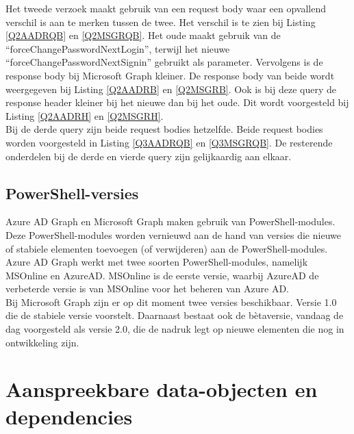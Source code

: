 Het tweede verzoek maakt gebruik van een request body waar een opvallend verschil is aan te merken tussen de twee. Het verschil is te zien bij Listing \ref{Q2AADRQB} en \ref{Q2MSGRQB}. Het oude maakt gebruik van de “forceChangePasswordNextLogin”, terwijl het nieuwe “forceChangePasswordNextSignin” gebruikt als parameter. Vervolgens is de response body bij Microsoft Graph kleiner. De response body van beide wordt weergegeven bij Listing \ref{Q2AADRB} en \ref{Q2MSGRB}. Ook is bij deze query de response header kleiner bij het nieuwe dan bij het oude. Dit wordt voorgesteld bij Listing \ref{Q2AADRH} en \ref{Q2MSGRH}. \\

Bij de derde query zijn beide request bodies hetzelfde. Beide request bodies worden voorgesteld in Listing \ref{Q3AADRQB} en \ref{Q3MSGRQB}. De resterende onderdelen bij de derde en vierde query zijn gelijkaardig aan elkaar.

\subsection{PowerShell-versies}


Azure \ac{AD} Graph en Microsoft Graph maken gebruik van PowerShell-modules. Deze PowerShell-modules worden vernieuwd aan de hand van versies die nieuwe of stabiele elementen toevoegen (of verwijderen) aan de PowerShell-modules. \\

Azure \ac{AD} Graph werkt met twee soorten PowerShell-modules, namelijk MSOnline en AzureAD. MSOnline is de eerste versie, waarbij AzureAD de verbeterde versie is van MSOnline voor het beheren van Azure \ac{AD}. \\

Bij Microsoft Graph zijn er op dit moment twee versies beschikbaar. Versie 1.0 die de stabiele versie voorstelt. Daarnaast bestaat ook de bètaversie, vandaag de dag voorgesteld als versie 2.0, die de nadruk legt op nieuwe elementen die nog in ontwikkeling zijn. \\ 


\section{Aanspreekbare data-objecten en dependencies}


